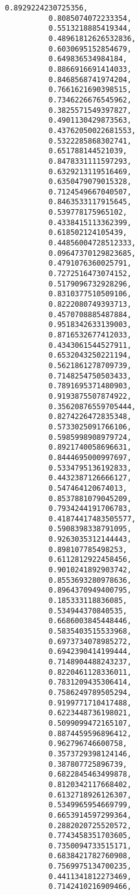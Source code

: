 \documentclass[11pt]{article}
\begin{document}
\begin{Verbatim}[commandchars=\\\{\}]
          0.8929224230725356,
          0.8085074072233354,
          0.5513218885419344,
          0.48961812626532836,
          0.6030695152854679,
          0.649836534984184,
          0.8866916691414033,
          0.8468568741974204,
          0.7661621690398515,
          0.7346226676545962,
          0.3825571549397827,
          0.4901130429873563,
          0.43762050022681553,
          0.5322285868302741,
          0.651788144521039,
          0.8478331111597293,
          0.6329213119516469,
          0.6350479079015328,
          0.7124549667040507,
          0.8463533117915645,
          0.539778175965102,
          0.4338415113362399,
          0.618502124105439,
          0.44856004728512333,
          0.09647370129823685,
          0.4791076360025791,
          0.7272516473074152,
          0.5179096732928296,
          0.8310377510509106,
          0.8222080749393713,
          0.4570708885487884,
          0.9518342633139003,
          0.8716532677412033,
          0.4343061544527911,
          0.6532043250221194,
          0.5621861278709739,
          0.7148254750503433,
          0.7891695371480903,
          0.9193875507874922,
          0.35620876559705444,
          0.8274226472835348,
          0.5733025091766106,
          0.5985998908979724,
          0.8921740058696631,
          0.8444695000997697,
          0.5334795136192833,
          0.4432387126666127,
          0.547464120674013,
          0.8537881079045209,
          0.7934244191706783,
          0.41874417483505577,
          0.5908398338791095,
          0.9263035312144443,
          0.898107785498253,
          0.6112812922458456,
          0.9010241892903742,
          0.8553693280978636,
          0.8964370949400795,
          0.185333118836085,
          0.534944370840535,
          0.6686003845448446,
          0.5835403515533968,
          0.6973734078985272,
          0.6942390414199444,
          0.7148904488243237,
          0.8220461128336011,
          0.7831209435306414,
          0.7586249789505294,
          0.9199771710417488,
          0.6223448736198021,
          0.5099099472165107,
          0.8874459596896412,
          0.962796746600758,
          0.3573729398124146,
          0.387807725896739,
          0.6822845463499878,
          0.8120342117668402,
          0.6132718926126307,
          0.5349965954669799,
          0.6653914597299364,
          0.2882020725520572,
          0.7743458351703605,
          0.7350094733515171,
          0.6838421782760908,
          0.7569975134700235,
          0.4411341812273469,
          0.7142410216909466,

\end{Verbatim}
\end{document}

